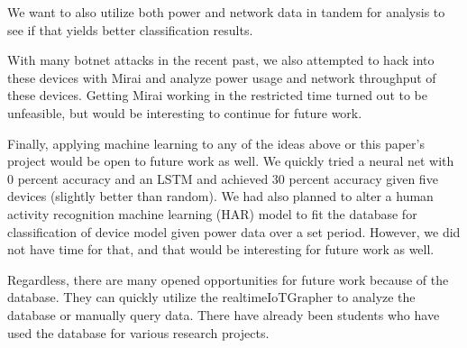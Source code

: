 We want to also utilize both power and network data in tandem for analysis to see if that yields better classification results.

With many botnet attacks in the recent past, we also attempted to hack into these devices with Mirai and analyze power usage and network throughput of these devices. Getting Mirai working in the restricted time turned out to be unfeasible, but would be interesting to continue for future work.

Finally, applying machine learning to any of the ideas above or this paper's project would be open to future work as well. We quickly tried a neural net with 0 percent accuracy and an LSTM and achieved 30 percent accuracy given five devices (slightly better than random). We had also planned to alter a human activity recognition machine learning (HAR)  model to fit the database for classification of device model given power data over a set period. However, we did not have time for that, and that would be interesting for future work as well.

Regardless, there are many opened opportunities for future work because of the database. They can quickly utilize the realtimeIoTGrapher to analyze the database or manually query data. There have already been students who have used the database for various research projects.